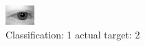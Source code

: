 \begin{figure}[h!]
\begin{center}
\includegraphics[width=0.60\columnwidth]{figures/ID403_class_1_target_2.png}
\end{center}
\caption{ Classification: 1 actual target: 2}
\label{fig:ID403_class_1_target_2}
\end{figure}
